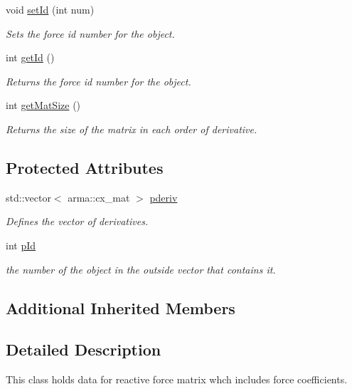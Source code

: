 \begin{DoxyCompactItemize}
void \hyperlink{classosea_1_1ofreq_1_1mat_force_react_a778765a5296698179dee923397032756}{set\-Id} (int num)
\begin{DoxyCompactList}\small\item\em Sets the force id number for the object. \end{DoxyCompactList}\item 
int \hyperlink{classosea_1_1ofreq_1_1mat_force_react_ad6416ceeafeb1f1852911fce0536b7f0}{get\-Id} ()
\begin{DoxyCompactList}\small\item\em Returns the force id number for the object. \end{DoxyCompactList}\item 
int \hyperlink{classosea_1_1ofreq_1_1mat_force_react_a9e9d9119e2ca2b49d0faea0897f7e300}{get\-Mat\-Size} ()
\begin{DoxyCompactList}\small\item\em Returns the size of the matrix in each order of derivative. \end{DoxyCompactList}\end{DoxyCompactItemize}
\subsection*{Protected Attributes}
\begin{DoxyCompactItemize}
\item 
std\-::vector$<$ arma\-::cx\-\_\-mat $>$ \hyperlink{classosea_1_1ofreq_1_1mat_force_react_a827cccb59204d98738a4d98b78942b45}{pderiv}
\begin{DoxyCompactList}\small\item\em Defines the vector of derivatives. \end{DoxyCompactList}\item 
int \hyperlink{classosea_1_1ofreq_1_1mat_force_react_a890a6fbcf9900d4a37ff05533f350f50}{p\-Id}
\begin{DoxyCompactList}\small\item\em the number of the object in the outside vector that contains it. \end{DoxyCompactList}\end{DoxyCompactItemize}
\subsection*{Additional Inherited Members}


\subsection{Detailed Description}
This class holds data for reactive force matrix whch includes force coefficients. 

